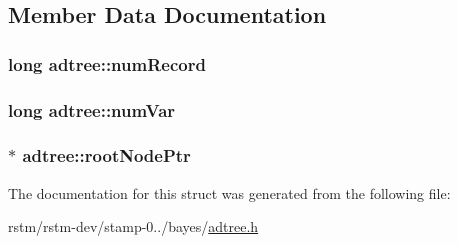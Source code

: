 \subsection{Member Data Documentation}
\hypertarget{structadtree_ad8124b711f662ca007d9f7674d7d60f0}{
\subsubsection[{num\-Record}]{\setlength{\rightskip}{0pt plus 5cm}long adtree\-::num\-Record}}\label{structadtree_ad8124b711f662ca007d9f7674d7d60f0}
\hypertarget{structadtree_a1ed48fe47484d51e7433053c51eaad4e}{
\subsubsection[{num\-Var}]{\setlength{\rightskip}{0pt plus 5cm}long adtree\-::num\-Var}}\label{structadtree_a1ed48fe47484d51e7433053c51eaad4e}
\hypertarget{structadtree_a640a516890892bd5658db1d137f42551}{
\subsubsection[{root\-Node\-Ptr}]{$\ast$ adtree\-::root\-Node\-Ptr}}\label{structadtree_a640a516890892bd5658db1d137f42551}


The documentation for this struct was generated from the following file\-:\begin{DoxyCompactItemize}
\item 
rstm/rstm-\/dev/stamp-\/0../bayes/\hyperlink{adtree_8h}{adtree.\-h}\end{DoxyCompactItemize}
